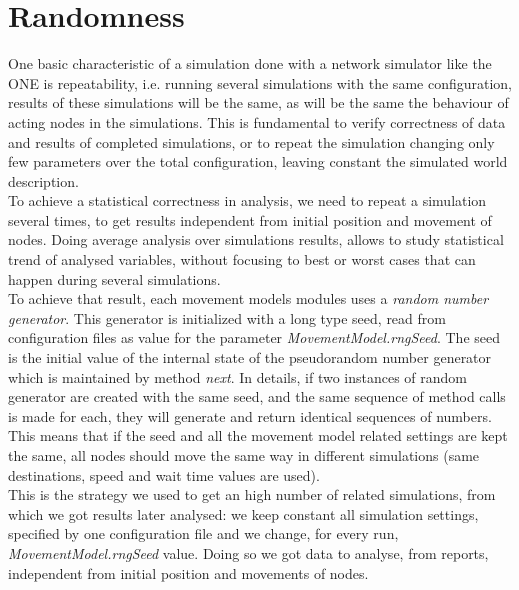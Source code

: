 \section{Randomness}
\label{randomness}
One basic characteristic of a simulation done with a network simulator like the ONE is repeatability, i.e. running several simulations with the same configuration, results of these simulations will be the same, as will be the same the behaviour of acting nodes in the simulations. This is fundamental to verify correctness of data and results of completed simulations, or to repeat the simulation changing only few parameters over the total configuration, leaving constant the simulated world description.
\\

To achieve a statistical correctness in analysis, we need to repeat a simulation several times, to get results independent from initial position and movement of nodes. Doing average analysis over simulations results, allows to study statistical trend of analysed variables, without focusing to best or worst cases that can happen during several simulations. 
\\

To achieve that result, each movement models modules uses a \textit{random number generator}. This generator is initialized with a long type seed, read from configuration files as value for the parameter \textit{MovementModel.rngSeed}. The seed is the initial value of the internal state of the pseudorandom number generator which is maintained by method \textit{next}. In details, if two instances of random generator are created with the same seed, and the same sequence of method calls is made for each, they will generate and return identical sequences of numbers. This means that if the seed and all the movement model related settings are kept the same, all nodes should move the same way in different simulations (same destinations, speed and wait time values are used).
\\

This is the strategy we used to get an high number of related simulations, from which we got results later analysed: we keep constant all simulation settings, specified by one configuration file and we change, for every run, \textit{MovementModel.rngSeed} value. Doing so we got data to analyse, from reports, independent from initial position and movements of nodes. 


